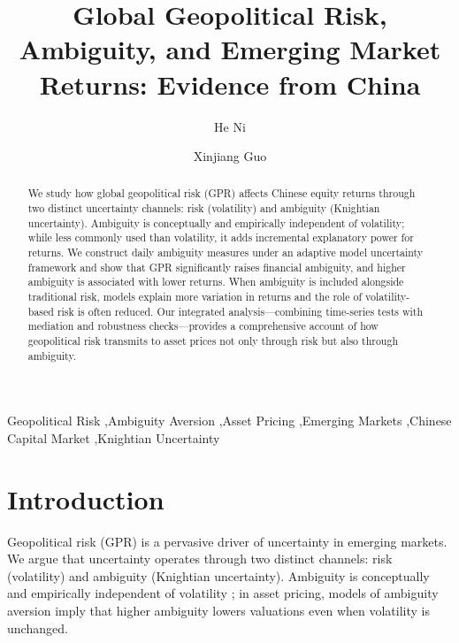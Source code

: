 \documentclass[preprint,12pt,authoryear]{elsarticle}
\begin{document}
\begin{frontmatter}

\title{Global Geopolitical Risk, Ambiguity, and Emerging Market Returns: Evidence from China}

\author[inst1]{He Ni}

\author[inst2]{Xinjiang Guo}

\begin{abstract}
We study how global geopolitical risk (GPR) affects Chinese equity returns through two distinct uncertainty channels: risk (volatility) and ambiguity (Knightian uncertainty). Ambiguity is conceptually and empirically independent of volatility; while less commonly used than volatility, it adds incremental explanatory power for returns. We construct daily ambiguity measures under an adaptive model uncertainty framework and show that GPR significantly raises financial ambiguity, and higher ambiguity is associated with lower returns. When ambiguity is included alongside traditional risk, models explain more variation in returns and the role of volatility-based risk is often reduced. Our integrated analysis—combining time-series tests with mediation and robustness checks—provides a comprehensive account of how geopolitical risk transmits to asset prices not only through risk but also through ambiguity.
\end{abstract}

\begin{keyword}
Geopolitical Risk \sep Ambiguity Aversion \sep Asset Pricing \sep Emerging Markets \sep Chinese Capital Market \sep Knightian Uncertainty
\end{keyword}

\end{frontmatter}

\section{Introduction}

Geopolitical risk (GPR) is a pervasive driver of uncertainty in emerging markets. We argue that uncertainty operates through two distinct channels: risk (volatility) and ambiguity (Knightian uncertainty). Ambiguity is conceptually and empirically independent of volatility \citep{knight1921risk, ellsberg1961risk}; in asset pricing, models of ambiguity aversion \citep{gilboa1989maxmin, klibanoff2005smooth} imply that higher ambiguity lowers valuations even when volatility is unchanged.
\end{document}
